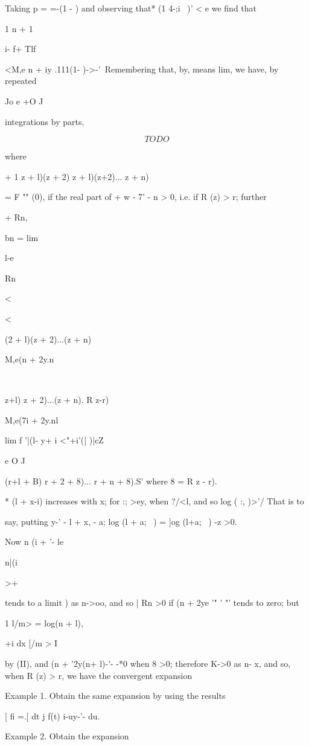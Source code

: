 {Taking p = =-(1 - ) and observing that* (1 4-;i~ )' < e we find that

1 n + 1

i- f+ Tlf

<M,e n + iy .111(1- )->-'\ Remembering that, by, means lim, we
have, by repeated

Jo e +O J

integrations by parts,

$$
TODO
$$

where

+ 1 z + l)(z + 2) z + l)(z+2)... z + n)

= F "" (0), if the real part of + w - 7' - n > 0, i.e. if R (z) > r;
further

+ Rn,

bn = lim

l-e

Rn\ \

<

<

(2 + l)(z + 2)...(z + n)

M,e(n + 2y.n\

\ \ {z+l) z + 2)...(z + n). R z-r)

M,e(7i + 2y.nl

lim f '|(l- y+ i <"+i'(| )|cZ

e O J

(r+l + B) r + 2 + 8)... r + n + 8).S' where 8 = R z - r).

* (l + x-i) increases with x; for :; >ey, when ?/<l, and so log ( :,
)>'/ That is to

say, putting y-' - l + x, - a; log (l + a;~ ) = ]og (l+a;~ ) -z >0.

%
%

Now n (i + '- le

n|(i

>+

tends to a limit ) as n->oo, and so | Rn >0 if (n + 2ye '" '
"' tends to zero; but

1 l/m> = log(n + l),

 +i dx [/m > I

by (II), and (n + '2y(n+ l)-'- -*0 when 8 >0; therefore K->0 as
n- x, and so, when R (z) > r, we have the convergent expansion

Example 1. Obtain the same expansion by using the results

[ fi =.[ dt j f(t) i-uy-'- du.

Example 2. Obtain the expansion

}}
